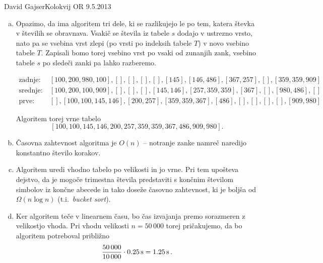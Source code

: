 \begin{naloga}{David Gajser}{Kolokvij OR 9.5.2013}
\begin{odgovor}
\begin{enumerate}[(a)]
\item Opazimo, da ima algoritem tri dele,
ki se razlikujejo le po tem, katera števka v številih se obravnava.
Vsakič se števila iz tabele $s$ dodajo v ustrezno vrsto,
nato pa se vsebina vrst zlepi
(po vrsti po indeksih tabele $T$)
v novo vsebino tabele $T$.
Zapisali bomo torej vsebino vrst po vsaki od zunanjih zank,
vsebino tabele $s$ po sledeči zanki pa lahko razberemo.
\begin{small}
\begin{align*}
\text{zadnje:} &\ [100, 200, 980, 100], [], [], [], [], [145], [146, 486], [367, 257], [], [359, 359, 909] \\
\text{srednje:} &\ [100, 200, 100, 909], [], [], [], [145, 146], [257, 359, 359], [367], [], [980, 486], [] \\
\text{prve:} &\ [], [100, 100, 145, 146], [200, 257], [359, 359, 367], [486], [], [], [], [], [909, 980]
\end{align*}
\end{small}
Algoritem torej vrne tabelo
$$
[100, 100, 145, 146, 200, 257, 359, 359, 367, 486, 909, 980] .
$$

\item Časovna zahtevnost algoritma je $O(n)$
-- notranje zanke namreč naredijo konstantno število korakov.

\item Algoritem uredi vhodno tabelo po velikosti in jo vrne.
Pri tem upošteva dejstvo,
da je mogoče trimestna števila predstaviti
s končnim številom simbolov iz končne abecede
in tako doseže časovno zahtevnost,
ki je boljša od $\Omega(n \log n)$
(t.i.~{\em bucket sort}).

\item Ker algoritem teče v linearnem času,
bo čas izvajanja premo sorazmeren z velikostjo vhoda.
Pri vhodu velikosti $n = 50\,000$ torej pričakujemo,
da bo algoritem potreboval približno
$$
{50\,000 \over 10\,000} \cdot 0.25 \operatorname{s} = 1.25 \operatorname{s} .
$$
\end{enumerate}
\end{odgovor}
\end{naloga}
